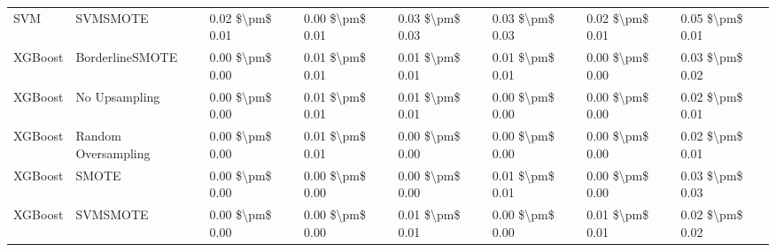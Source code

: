 \begin{tabular}{llllllll}
                            SVM &                      SVMSMOTE & 0.02 \$\textbackslash pm\$ 0.01 &           0.00 \$\textbackslash pm\$ 0.01 &       0.03 \$\textbackslash pm\$ 0.03 &        0.03 \$\textbackslash pm\$ 0.03 &                         0.02 \$\textbackslash pm\$ 0.01 &     0.05 \$\textbackslash pm\$ 0.01 \\
                        XGBoost &               BorderlineSMOTE & 0.00 \$\textbackslash pm\$ 0.00 &           0.01 \$\textbackslash pm\$ 0.01 &       0.01 \$\textbackslash pm\$ 0.01 &        0.01 \$\textbackslash pm\$ 0.01 &                         0.00 \$\textbackslash pm\$ 0.00 &     0.03 \$\textbackslash pm\$ 0.02 \\
                        XGBoost &                 No Upsampling & 0.00 \$\textbackslash pm\$ 0.00 &           0.01 \$\textbackslash pm\$ 0.01 &       0.01 \$\textbackslash pm\$ 0.01 &        0.00 \$\textbackslash pm\$ 0.00 &                         0.00 \$\textbackslash pm\$ 0.00 &     0.02 \$\textbackslash pm\$ 0.01 \\
                        XGBoost &           Random Oversampling & 0.00 \$\textbackslash pm\$ 0.00 &           0.01 \$\textbackslash pm\$ 0.01 &       0.00 \$\textbackslash pm\$ 0.00 &        0.00 \$\textbackslash pm\$ 0.00 &                         0.00 \$\textbackslash pm\$ 0.00 &     0.02 \$\textbackslash pm\$ 0.01 \\
                        XGBoost &                         SMOTE & 0.00 \$\textbackslash pm\$ 0.00 &           0.00 \$\textbackslash pm\$ 0.00 &       0.00 \$\textbackslash pm\$ 0.00 &        0.01 \$\textbackslash pm\$ 0.01 &                         0.00 \$\textbackslash pm\$ 0.00 &     0.03 \$\textbackslash pm\$ 0.03 \\
                        XGBoost &                      SVMSMOTE & 0.00 \$\textbackslash pm\$ 0.00 &           0.00 \$\textbackslash pm\$ 0.00 &       0.01 \$\textbackslash pm\$ 0.01 &        0.00 \$\textbackslash pm\$ 0.00 &                         0.01 \$\textbackslash pm\$ 0.01 &     0.02 \$\textbackslash pm\$ 0.02 \\
\bottomrule
\end{tabular}
